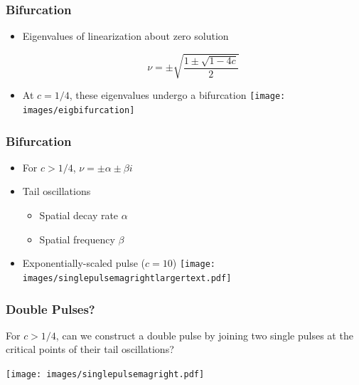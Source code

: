 \documentclass[16pt]{beamer}
\begin{document}
\begin{frame}
	\frametitle{Bifurcation}
	\fontsize{16}{7.2}\selectfont
	\begin{itemize}
	\item Eigenvalues of linearization about zero solution
		\begin{center}
		\[ \nu = \pm \sqrt{ \frac{1 \pm \sqrt{1 - 4c } }{ 2} } \]
		\end{center}
	\item At $c = 1/4$, these eigenvalues undergo a bifurcation
	\texttt{[image: images/eigbifurcation]}
\end{itemize}
\end{frame}

\begin{frame}
	\frametitle{Bifurcation}
	\fontsize{16}{7.2}\selectfont
	\begin{itemize}
		\item<1-> For $c > 1/4$, $\nu = \pm \alpha \pm \beta i$
		\vspace{0.5cm}
		\item<2-> Tail oscillations
		\begin{itemize}
			\item Spatial decay rate $\alpha$
			\item Spatial frequency $\beta$
		\end{itemize}
		\vspace{0.5cm}
		\item<3-> Exponentially-scaled pulse ($c = 10$)
		\texttt{[image: images/singlepulsemagrightlargertext.pdf]}
	\end{itemize}
\end{frame}

\begin{frame}
	\frametitle{Double Pulses?}
	\fontsize{16}{7.2}\selectfont

	For $c>1/4$, can we construct a double pulse by joining two single pulses at the critical points of their tail oscillations?

	\begin{center}
	\texttt{[image: images/singlepulsemagright.pdf]}
	\end{center}

\end{frame}
\end{document}
